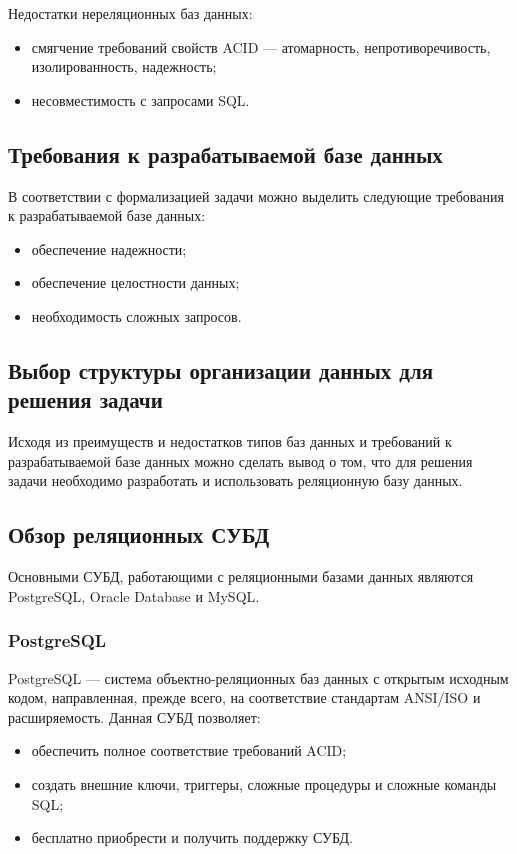 Недостатки нереляционных баз данных:

\begin{itemize}
	\item смягчение требований свойств ACID --- атомарность, непротиворечивость, изолированность, надежность;
	\item несовместимость с запросами SQL.
\end{itemize}

\subsection{Требования к разрабатываемой базе данных}

В соответствии с формализацией задачи можно выделить следующие требования к разрабатываемой базе данных:

\begin{itemize}
	\item обеспечение надежности;
	\item обеспечение целостности данных;
	\item необходимость сложных запросов.
\end{itemize}

\subsection{Выбор структуры организации данных для решения задачи}

Исходя из преимуществ и недостатков типов баз данных и требований к разрабатываемой базе данных можно сделать вывод о том, что для решения задачи необходимо разработать и использовать реляционную базу данных.

\subsection{Обзор реляционных СУБД}

Основными СУБД, работающими с реляционными базами данных являются PostgreSQL, Oracle Database и MySQL.

\subsubsection{PostgreSQL}

PostgreSQL --- система объектно-реляционных баз данных с открытым исходным кодом, направленная, прежде всего, на соответствие стандартам ANSI/ISO и расширяемость. Данная СУБД позволяет:

\begin{itemize}
	\item обеспечить полное соответствие требований ACID;
	\item создать внешние ключи, триггеры, сложные процедуры и сложные команды SQL;
	\item бесплатно приобрести и получить поддержку СУБД.
\end{itemize}

